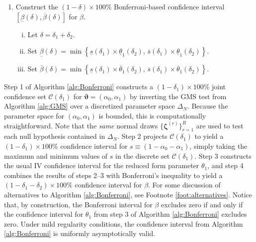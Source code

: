 \begin{alg}
\begin{enumerate}
\begin{enumerate}[(i)]
      \end{enumerate}
    \item Construct the $(1 - \delta)\times 100\%$ Bonferroni-based confidence interval $\left[ \underline{\beta}(\delta), \overline{\beta}(\delta) \right]$ for $\beta$.
      \begin{enumerate}[(i)]
        \item Let $\delta = \delta_1 + \delta_2$.
        \item Set $\underline{\beta}(\delta) = \min \left\{ \underline{s}(\delta_1)\times \underline{\theta}_1(\delta_2),\, \overline{s}(\delta_1)\times \underline{\theta}_1(\delta_2) \right\}$.
        \item Set $\overline{\beta}(\delta) = \min \left\{ \underline{s}(\delta_1)\times \overline{\theta}_1(\delta_2),\, \overline{s}(\delta_1)\times \overline{\theta}_1(\delta_2) \right\}$.
      \end{enumerate}
  \end{enumerate}
  \label{alg:Bonferroni}
\end{alg}

Step 1 of Algorithm \ref{alg:Bonferroni} constructs a $(1 - \delta_1)\times 100\%$ joint confidence set $\mathcal{C}(\delta_1)$ for $\boldsymbol{\vartheta} = (\alpha_0, \alpha_1)$ by inverting the GMS test from Algorithm \ref{alg:GMS} over a discretized parameter space $\Delta_N$.
Because the parameter space for $(\alpha_0, \alpha_1)$ is bounded, this is computationally straightforward.
Note that the \emph{same} normal draws $\{\boldsymbol{\zeta}^{(r)}\}_{r=1}^R$ are used to test each null hypothesis contained in $\Delta_N$.
Step 2 projects $\mathcal{C}(\delta_1)$ to yield a $(1 - \delta_1)\times 100\%$ confidence interval for $s \equiv (1 - \alpha_0 - \alpha_1)$, simply taking the maximum and minimum values of $s$ in the discrete set  $\mathcal{C}(\delta_1)$.
Step 3 constructs the usual IV confidence interval for the reduced form parameter $\theta_1$, and step 4 combines the results of steps 2--3 with Bonferroni's inequality to yield a $(1 - \delta_1 - \delta_2) \times 100\%$ confidence interval for $\beta$.
For some discussion of alternatives to Algorithm \ref{alg:Bonferroni}, see Footnote \ref{foot:alternatives}.
Notice that, by construction, the Bonferroni interval for $\beta$ excludes zero if and only if the confidence interval for $\theta_1$ from step 3 of Algorithm \ref{alg:Bonferroni} excludes zero.
Under mild regularity conditions, the confidence interval from Algorithm \ref{alg:Bonferroni} is uniformly asymptotically valid.

